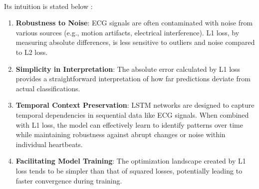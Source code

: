 \documentclass[nonacm,sigconf]{acmart}
\begin{document}
\\Its intuition is stated below : 
\begin{enumerate}
    \item \textbf{Robustness to Noise}: ECG signals are often contaminated with noise from various sources (e.g.,
motion artifacts, electrical interference). L1 loss, by measuring absolute differences, is less sensitive
to outliers and noise compared to L2 loss.
\item \textbf{ Simplicity in Interpretation}: The absolute error calculated by L1 loss provides a straightforward
interpretation of how far predictions deviate from actual classifications.
\item \textbf{ Temporal Context Preservation}: LSTM networks are designed to capture temporal dependencies
in sequential data like ECG signals. When combined with L1 loss, the model can effectively learn to
identify patterns over time while maintaining robustness against abrupt changes or noise within
individual heartbeats.
\item \textbf{ Facilitating Model Training}: The optimization landscape created by L1 loss tends to be simpler
than that of squared losses, potentially leading to faster convergence during training.  

\end{enumerate}
\end{document}

